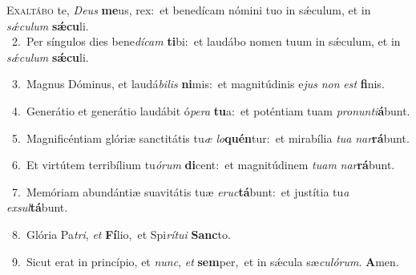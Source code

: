 \lettrine{\initial\textcolor{\initialcolor}{E}}{xaltábo} te, \textit{De}\-\textit{us} \textbf{me}\-us, rex:~\star et benedícam nómini tuo in sǽculum, et in \textit{sǽ}\-\textit{cu}\textit{lum} \textbf{sǽ}\-\textbf{cu}li.\\
{\numbfont\textcolor{\numbcolor}{~2.}}~Per síngulos dies bene\-\textit{dí}\-\textit{cam} \textbf{ti}\-bi:~\star et laudábo nomen tuum in sǽculum, et in \textit{sǽ}\-\textit{cu}\textit{lum} \textbf{sǽ}\-\textbf{cu}li.\par
{\numbfont\textcolor{\numbcolor}{~3.}}~Magnus Dóminus, et laudá\-\textit{bi}\-\textit{lis} \textbf{ni}\-mis:~\star et magnitúdinis e\textit{jus} \textit{non} \textit{est} \textbf{fi}\-nis.\par
{\numbfont\textcolor{\numbcolor}{~4.}}~Generátio et generátio laudábit ó\-\textit{pe}\-\textit{ra} \textbf{tu}\-a:~\star et poténtiam tuam \textit{pro}\-\textit{nun}\textit{ti}\textbf{á}bunt.\par
{\numbfont\textcolor{\numbcolor}{~5.}}~Magnificéntiam glóriæ sanctitátis tu\textit{æ} \textit{lo}\-\textbf{quén}tur:~\star et mirabília \textit{tu}\-\textit{a} \textit{nar}\-\textbf{rá}bunt.\par
{\numbfont\textcolor{\numbcolor}{~6.}}~Et virtútem terribílium tu\-\textit{ó}\-\textit{rum} \textbf{di}\-cent:~\star et magnitúdinem \textit{tu}\-\textit{am} \textit{nar}\-\textbf{rá}bunt.\par
{\numbfont\textcolor{\numbcolor}{~7.}}~Memóriam abundántiæ suavitátis tuæ \textit{e}\-\textit{ruc}\textbf{tá}bunt:~\star et justítia tu\textit{a} \textit{ex}\-\textit{sul}\textbf{tá}bunt.\par
{\numbfont\textcolor{\numbcolor}{~8.}}~Glória Pa\-\textit{tri}\-, \textit{et} \textbf{Fí}\-lio,~\star et Spi\-\textit{rí}\-\textit{tu}\textit{i} \textbf{Sanc}\-to.\par
{\numbfont\textcolor{\numbcolor}{~9.}}~Sicut erat in princípio, et \textit{nunc}\-, \textit{et} \textbf{sem}\-per,~\star et in sǽcula sæ\-\textit{cu}\-\textit{ló}\textit{rum}. \textbf{A}\-men.\par
